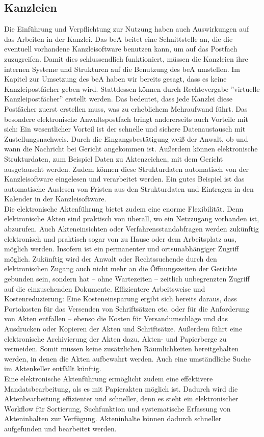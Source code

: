 \subsection{Kanzleien}
Die Einführung und Verpflichtung zur Nutzung haben auch Auswirkungen auf das Arbeiten in der Kanzlei. Das beA beitet eine Schnittstelle an, die die eventuell vorhandene Kanzleisoftware benutzen kann, um auf das Postfach zuzugreifen. Damit dies schlussendlich funktioniert, müssen die Kanzleien ihre internen Systeme und Strukturen auf die Benutzung des beA umstellen. Im Kapitel zur Umsetzung des beA haben wir bereits gesagt, dass es keine Kanzleipostfächer geben wird. Stattdessen können durch Rechtevergabe ''virtuelle Kanzleipostfächer'' erstellt werden. Das bedeutet, dass jede Kanzlei diese Postfächer zuerst erstellen muss, was zu erheblichem Mehraufwand führt.  
Das besondere elektronische Anwaltspostfach bringt andererseits auch Vorteile mit sich: Ein wesentlicher Vorteil ist der schnelle und sichere Datenaustausch mit Zustellungsnachweis. Durch die Eingangsbestätigung weiß der Anwalt, ob und wann die Nachricht bei Gericht angekommen ist. Außerdem können elektronische Strukturdaten, zum Beispiel Daten zu Aktenzeichen, mit dem Gericht ausgetauscht werden. Zudem können diese Strukturdaten automatisch von der Kanzleisoftware eingelesen und verarbeitet werden. Ein gutes Beispiel ist das automatische Auslesen von Fristen aus den Strukturdaten und Eintragen in den Kalender in der Kanzleisoftware. \\
Die elektronische Aktenführung bietet zudem eine enorme Flexibilität. Denn elektronische Akten sind praktisch von überall, wo ein Netzzugang vorhanden ist, abzurufen. Auch Akteneinsichten oder Verfahrensstandabfragen werden zukünftig elektronisch und praktisch sogar von zu Hause oder dem Arbeitsplatz aus, möglich werden. Insofern ist ein permanenter und ortsunabhängiger Zugriff möglich. Zukünftig wird der Anwalt oder Rechtssuchende durch den elektronischen Zugang auch nicht mehr an die Öffnungszeiten der Gerichte gebunden sein, sondern hat – ohne Wartezeiten –  zeitlich unbegrenzten Zugriff auf die einzusehenden Dokumente.
Effizientere Arbeitsweise und Kostenreduzierung: Eine Kosteneinsparung ergibt sich bereits daraus, dass Portokosten für das Versenden von Schriftsätzen etc. oder für die Anforderung von Akten entfallen – ebenso die Kosten für Versandumschläge und das Ausdrucken oder Kopieren der Akten und Schriftsätze. Außerdem führt eine elektronische Archivierung der Akten dazu, Akten- und Papierberge zu vermeiden. Somit müssen keine zusätzlichen Räumlichkeiten bereitgehalten werden, in denen die Akten aufbewahrt werden. Auch eine umständliche Suche im Aktenkeller entfällt künftig. \\
Eine elektronische Aktenführung ermöglicht zudem eine effektivere Mandatsbearbeitung, als es mit Papierakten möglich ist. Dadurch wird die Aktenbearbeitung effizienter und schneller, denn es steht ein elektronischer Workflow für Sortierung, Suchfunktion und systematische Erfassung von Akteninhalten zur Verfügung. Akteninhalte können dadurch schneller aufgefunden und bearbeitet werden.

